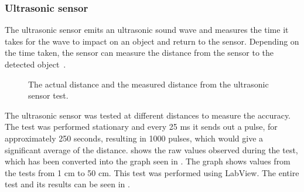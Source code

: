 \subsubsection{Ultrasonic sensor} \label{sec:ultrasonic_sensor}
The ultrasonic sensor emits an ultrasonic sound wave and measures the time it takes for the wave to impact on an object and return to the sensor. Depending on the time taken, the sensor can measure the distance from the sensor to the detected object~\citep{lego_education}. 

\begin{figure}[H]
     \caption{\label{fig:ultrasonic_sensor_test_graph} The actual distance and the measured distance from the ultrasonic sensor test.}
\end{figure}

The ultrasonic sensor was tested at different distances to measure the accuracy. The test was performed stationary and every 25 ms it sends out a pulse, for approximately 250 seconds, resulting in 1000 pulses, which would give a significant average of the distance.  shows the raw values observed during the test, which has been converted into the graph seen in . The graph shows values from the tests from 1 cm to 50 cm. This test was performed using LabView. The entire test and its results can be seen in .

